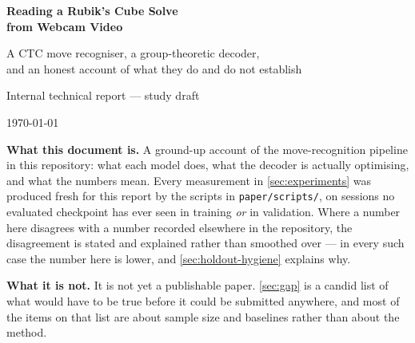 \documentclass[11pt,a4paper]{article}
\newcommand{\file}[1]{\texttt{\small #1}}
\theoremstyle{definition}
\begin{document}
\begin{titlepage}
\centering
\vspace*{2.2cm}
{\Huge\bfseries Reading a Rubik's Cube Solve\\[4pt] from Webcam Video\par}
\vspace{10pt}
{\Large A CTC move recogniser, a group-theoretic decoder,\\
and an honest account of what they do and do not establish\par}
\vspace{1.4cm}
{\large Internal technical report --- study draft\par}
\vspace{6pt}
{\color{pgrey}\large \today\par}
\vspace{2.2cm}
\begin{minipage}{0.86\linewidth}\small
\noindent\textbf{What this document is.} A ground-up account of the
move-recognition pipeline in this repository: what each model does, what the
decoder is actually optimising, and what the numbers mean. Every measurement
in \cref{sec:experiments} was produced fresh for this report by the scripts
in \file{paper/scripts/}, on sessions no evaluated checkpoint has ever seen
in training \emph{or} in validation. Where a number here disagrees with a
number recorded elsewhere in the repository, the disagreement is stated and
explained rather than smoothed over --- in every such case the number here is
lower, and \cref{sec:holdout-hygiene} explains why.

\vspace{6pt}
\noindent\textbf{What it is not.} It is not yet a publishable paper.
\cref{sec:gap} is a candid list of what would have to be true before it
could be submitted anywhere, and most of the items on that list are about
sample size and baselines rather than about the method.
\end{minipage}
\vfill
\end{titlepage}

\tableofcontents
\clearpage











\appendix




\end{document}
